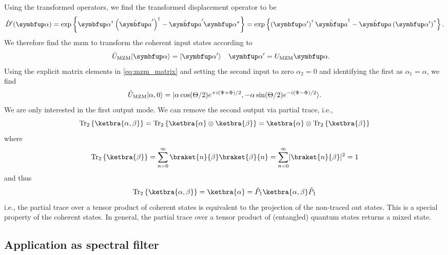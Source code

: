 Using the transformed operators, we find the transformed displacement operator to be~\cite[p.~210]{Vogel2006}
\begin{equation}
	\hat{D}^\prime(\vb{\alpha})
	=
	\exp\left\{
		\vb{\alpha}^\trans
		\left(\hat{\vb{a}}^\prime\right)^\dagger
		-
		\hat{\vb{a}}^\prime
		\vb{\alpha}^*
	\right\}
	=
	\exp\left\{
		\left(\vb{\alpha}^\prime\right)^\trans
		\hat{\vb{a}}^\dagger
		-
		\hat{\vb{a}}
		\left(\vb{\alpha}^\prime\right)^*
	\right\}
	.
\end{equation}
We therefore find the \gls{mzm} to transform the coherent input states according to
\begin{align}
	\hat{U}_\text{MZM}
	\ket{\vb{\alpha}}
	&=
	\ket{\vb{\alpha}^\prime}
	&
	\vb{\alpha}^\prime
	&=
	U_\text{MZM}
	\vb{\alpha}
	.
\end{align}
Using the explicit matrix elements in \cref{eq:mzm_matrix} and setting the second input to zero $\alpha_2=0$ and identifying the first as $\alpha_1=\alpha$, we find
\begin{equation}
	\hat{U}_\text{MZM}
	\lvert\alpha,0\rangle
	=
	\lvert\alpha\cos(\Theta/2)e^{+i(\Psi+\Phi)/2},-\alpha\sin(\Theta/2)e^{-i(\Psi-\Phi)/2}\rangle
	.
\end{equation}
We are only interested in the first output mode.
We can remove the second output via partial trace, i.e.,
\begin{equation}
	\trace_2\left\{
		\ketbra{\alpha,\beta}
	\right\}
	=
	\trace_2\left\{
		\ketbra{\alpha}
		\otimes
		\ketbra{\beta}
	\right\}
	=
	\ketbra{\alpha}
	\otimes
	\trace_2\left\{
		\ketbra{\beta}
	\right\}
\end{equation}
where
\begin{equation}
	\trace_2\left\{
		\ketbra{\beta}
	\right\}
	=
	\sum_{n=0}^\infty
	\braket{n}{\beta}
	\braket{\beta}{n}
	=
	\sum_{n=0}^\infty
	\abs{\braket{n}{\beta}}^2
	=
	1
\end{equation}
and thus
\begin{equation}
	\trace_2\left\{
		\ketbra{\alpha,\beta}
	\right\}
	=
	\ketbra{\alpha}
	=
	\hat{P}_1
	\ketbra{\alpha,\beta}
	\hat{P}_1
\end{equation}
i.e., the partial trace over a tensor product of coherent states is equivalent to the projection of the non-traced out states.
This is a special property of the coherent states.
In general, the partial trace over a tensor product of (entangled) quantum states returns a mixed state.

\subsection{Application as spectral filter}